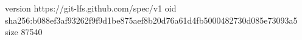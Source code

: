 version https://git-lfs.github.com/spec/v1
oid sha256:b088ef3af93262f9f9d1be875aef8b20d76a61d4fb5000482730d085e73093a5
size 87540
